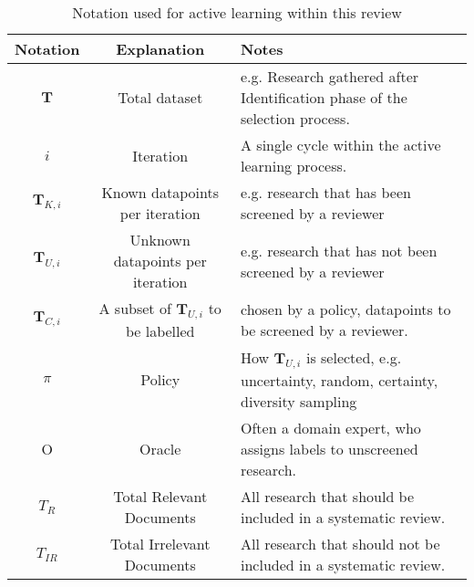 
\begin{table*}[t]
    \centering
    \footnotesize

    \begin{tabular}{|c|c|>{\raggedright\arraybackslash}p{11cm}|}
        \hline
        \textbf{Notation}    & \textbf{Explanation}                            & \textbf{Notes}                                                                                \\
        \hline
        \(\textbf{T}\)       & Total dataset                                   & e.g. Research gathered after Identification phase of the selection process.                   \\
        \hline
        \(i\)                & Iteration                                       & A single cycle within the active learning process.                                            \\
        \hline
        \(\textbf{T}_{K,i}\) & Known datapoints per iteration                  & e.g. research that has been screened by a reviewer                                            \\
        \hline
        \(\textbf{T}_{U,i}\) & Unknown datapoints per iteration                & e.g. research that has not been screened by a reviewer                                        \\
        \hline
        \(\textbf{T}_{C,i}\) & A subset of \(\textbf{T}_{U,i}\) to be labelled & chosen by a policy, datapoints to be screened by a reviewer.                                  \\
        \hline
        $\pi$                & Policy                                          & How \(\textbf{T}_{U,i}\) is selected, e.g. uncertainty, random, certainty, diversity sampling \\
        \hline
        O                    & Oracle                                          & Often a domain expert, who assigns labels to unscreened research.                             \\
        \hline
        \(T_R\)              & Total Relevant Documents                        & All research that should be included in a systematic review.                                  \\
        \hline
        \(T_{IR}\)           & Total Irrelevant Documents                      & All research that should not be included in a systematic review.                              \\
        \hline
    \end{tabular}
    \caption{Notation used for active learning within this review}
    \label{tab:notation}
\end{table*}
